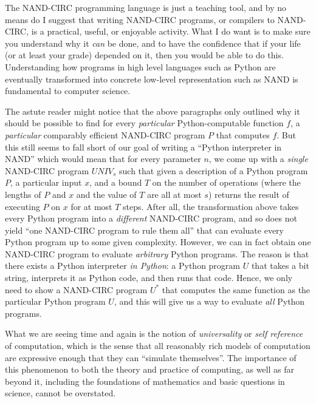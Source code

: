 The NAND-CIRC programming language is just a teaching tool, and by no
means do I suggest that writing NAND-CIRC programs, or compilers to
NAND-CIRC, is a practical, useful, or enjoyable activity. What I do want
is to make sure you understand why it \emph{can} be done, and to have
the confidence that if your life (or at least your grade) depended on
it, then you would be able to do this. Understanding how programs in
high level languages such as Python are eventually transformed into
concrete low-level representation such as NAND is fundamental to
computer science.

The astute reader might notice that the above paragraphs only outlined
why it should be possible to find for every \emph{particular}
Python-computable function \(f\), a \emph{particular} comparably
efficient NAND-CIRC program \(P\) that computes \(f\). But this still
seems to fall short of our goal of writing a ``Python interpreter in
NAND'' which would mean that for every parameter \(n\), we come up with
a \emph{single} NAND-CIRC program \(\ensuremath{\mathit{UNIV}}_s\) such
that given a description of a Python program \(P\), a particular input
\(x\), and a bound \(T\) on the number of operations (where the lengths
of \(P\) and \(x\) and the value of \(T\) are all at most \(s\)) returns
the result of executing \(P\) on \(x\) for at most \(T\) steps. After
all, the transformation above takes every Python program into a
\emph{different} NAND-CIRC program, and so does not yield ``one
NAND-CIRC program to rule them all'' that can evaluate every Python
program up to some given complexity. However, we can in fact obtain one
NAND-CIRC program to evaluate \emph{arbitrary} Python programs. The
reason is that there exists a Python interpreter \emph{in Python}: a
Python program \(U\) that takes a bit string, interprets it as Python
code, and then runs that code. Hence, we only need to show a NAND-CIRC
program \(U^*\) that computes the same function as the particular Python
program \(U\), and this will give us a way to evaluate \emph{all} Python
programs.

What we are seeing time and again is the notion of \emph{universality}
or \emph{self reference} of computation, which is the sense that all
reasonably rich models of computation are expressive enough that they
can ``simulate themselves''. The importance of this phenomenon to both
the theory and practice of computing, as well as far beyond it,
including the foundations of mathematics and basic questions in science,
cannot be overstated.

